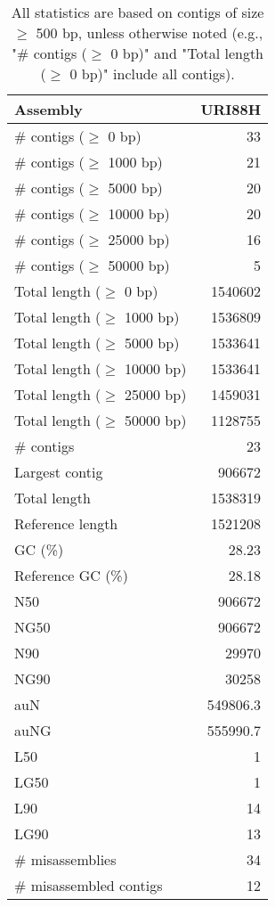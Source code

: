 \documentclass[12pt,a4paper]{article}
\begin{document}
\begin{table}[ht]
\begin{center}
\caption{All statistics are based on contigs of size $\geq$ 500 bp, unless otherwise noted (e.g., "\# contigs ($\geq$ 0 bp)" and "Total length ($\geq$ 0 bp)" include all contigs).}
\begin{tabular}{|l*{1}{|r}|}
\hline
Assembly & URI88H \\ \hline
\# contigs ($\geq$ 0 bp) & 33 \\ \hline
\# contigs ($\geq$ 1000 bp) & 21 \\ \hline
\# contigs ($\geq$ 5000 bp) & 20 \\ \hline
\# contigs ($\geq$ 10000 bp) & 20 \\ \hline
\# contigs ($\geq$ 25000 bp) & 16 \\ \hline
\# contigs ($\geq$ 50000 bp) & 5 \\ \hline
Total length ($\geq$ 0 bp) & 1540602 \\ \hline
Total length ($\geq$ 1000 bp) & 1536809 \\ \hline
Total length ($\geq$ 5000 bp) & 1533641 \\ \hline
Total length ($\geq$ 10000 bp) & 1533641 \\ \hline
Total length ($\geq$ 25000 bp) & 1459031 \\ \hline
Total length ($\geq$ 50000 bp) & 1128755 \\ \hline
\# contigs & 23 \\ \hline
Largest contig & 906672 \\ \hline
Total length & 1538319 \\ \hline
Reference length & 1521208 \\ \hline
GC (\%) & 28.23 \\ \hline
Reference GC (\%) & 28.18 \\ \hline
N50 & 906672 \\ \hline
NG50 & 906672 \\ \hline
N90 & 29970 \\ \hline
NG90 & 30258 \\ \hline
auN & 549806.3 \\ \hline
auNG & 555990.7 \\ \hline
L50 & 1 \\ \hline
LG50 & 1 \\ \hline
L90 & 14 \\ \hline
LG90 & 13 \\ \hline
\# misassemblies & 34 \\ \hline
\# misassembled contigs & 12 \\ \hline

\end{tabular}
\end{center}
\end{table}
\end{document}
